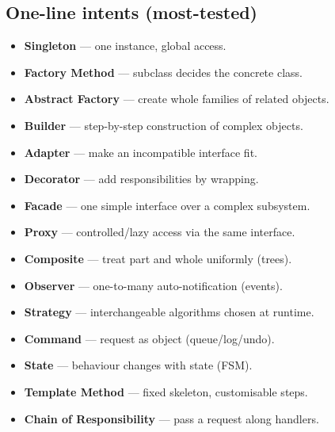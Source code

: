 \documentclass[hidelinks]{article}
\begin{document}
\subsection*{One-line intents (most-tested)}
\begin{itemize}
  \item \textbf{Singleton} --- one instance, global access.
  \item \textbf{Factory Method} --- subclass decides the concrete class.
  \item \textbf{Abstract Factory} --- create whole families of related objects.
  \item \textbf{Builder} --- step-by-step construction of complex objects.
  \item \textbf{Adapter} --- make an incompatible interface fit.
  \item \textbf{Decorator} --- add responsibilities by wrapping.
  \item \textbf{Facade} --- one simple interface over a complex subsystem.
  \item \textbf{Proxy} --- controlled/lazy access via the same interface.
  \item \textbf{Composite} --- treat part and whole uniformly (trees).
  \item \textbf{Observer} --- one-to-many auto-notification (events).
  \item \textbf{Strategy} --- interchangeable algorithms chosen at runtime.
  \item \textbf{Command} --- request as object (queue/log/undo).
  \item \textbf{State} --- behaviour changes with state (FSM).
  \item \textbf{Template Method} --- fixed skeleton, customisable steps.
  \item \textbf{Chain of Responsibility} --- pass a request along handlers.
\end{itemize}
\end{document}
